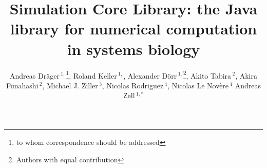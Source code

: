 \documentclass{bioinfo}
\begin{document}

\title[Simulation Core Library]{Simulation Core Library: the Java
library for numerical computation in systems biology} \author[Dr\"ager
\textit{et~al.}]{%
Andreas Dr\"ager\,$^{1,}$\footnote{to whom correspondence should be
addressed}\hspace{.3em},
Roland Keller\,$^{1,}$\dag,
Alexander D\"orr\,$^{1,}$\footnote{Authors with equal
contribution}\hspace{.3em}, Akito Tabira\,$^{2}$,
Akira Funahashi\,$^{2}$,
Michael J. Ziller\,$^{3}$,
Nicolas Rodriguez\,$^{4}$,
Nicolas Le Nov\`{e}re\,$^{4}$
Andreas Zell\,$^{1,*}$}
\address{$^{1}$Center for Bioinformatics Tuebingen (ZBIT), University of
Tuebingen, T\"ubingen, Germany\\
$^{2}$Keio University, Graduate School of Science and Technology, Yokohama,
Japan\\
$^{3}$Department of Stem Cell and Regenerative Biology, Harvard University,
Cambridge, MA, USA\\
$^{4}$European Bioinformatics Institute, Wellcome Trust Genome Campus,
Hinxton, Cambridge, UK}



\maketitle
\end{document}
